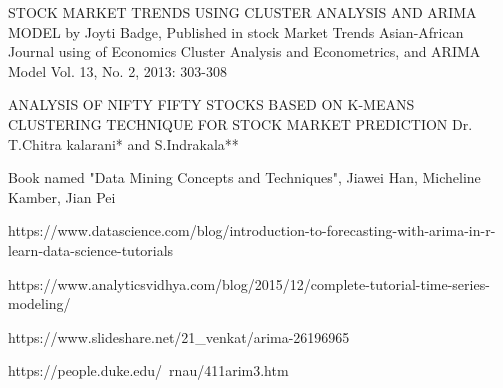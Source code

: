 \documentclass{article}
\begin{document}
\begin{thebibliography}{widestlabel}
	
	STOCK MARKET TRENDS USING CLUSTER ANALYSIS AND ARIMA MODEL by Joyti Badge, Published in stock Market Trends
	Asian-African Journal using of Economics Cluster Analysis
	and Econometrics, and ARIMA Model Vol. 13, No. 2, 2013: 303-308
	
	ANALYSIS OF NIFTY FIFTY STOCKS BASED ON K-MEANS CLUSTERING TECHNIQUE FOR STOCK MARKET PREDICTION Dr. T.Chitra kalarani* and S.Indrakala**
	
	Book named "Data Mining Concepts and Techniques", Jiawei Han, Micheline Kamber, Jian Pei
	
	https://www.datascience.com/blog/introduction-to-forecasting-with-arima-in-r-learn-data-science-tutorials
	
	https://www.analyticsvidhya.com/blog/2015/12/complete-tutorial-time-series-modeling/
	
	https://www.slideshare.net/21\_venkat/arima-26196965
	
	https://people.duke.edu/~rnau/411arim3.htm
	
\end{thebibliography}
\end{document}
